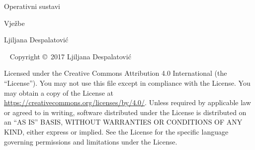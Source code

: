 
\thispagestyle{empty}
\begin{center}
 
\vspace*{5cm}
\par
\normalfont\fontsize{30}{30}\sffamily\selectfont%
Operativni sustavi\par %
\vspace*{1cm}

{\Large Vježbe}\par
\vspace*{1cm}

{\Large Ljiljana Despalatović}\par %

\end{center}



%

\newpage
~\vfill
\thispagestyle{empty}
%
\noindent Copyright \copyright\ 2017 Ljiljana Despalatović%

\noindent Licensed under the Creative Commons Attribution 4.0 International (the ``License''). You may not use this file except in compliance with the License. You may obtain a copy of the License at \url{https://creativecommons.org/licenses/by/4.0/}. Unless required by applicable law or agreed to in writing, software distributed under the License is distributed on an \textsc{``AS IS'' BASIS, WITHOUT WARRANTIES OR CONDITIONS OF ANY KIND}, either express or implied. See the License for the specific language governing permissions and limitations under the License.%


